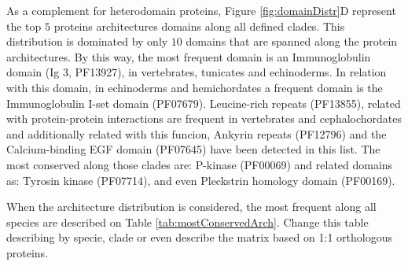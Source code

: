 \documentclass[11pt]{article}
\newcommand{\TODO}[1]{\begingroup\color{red}#1\endgroup}
\begin{document}
As a complement for heterodomain proteins, Figure \ref{fig:domainDistr}D 
represent the top $5$ proteins architectures domains along all defined clades. 
This distribution is dominated by only $10$ domains that are spanned along 
the protein architectures. By this way, the most frequent domain is an 
Immunoglobulin domain (Ig 3, PF13927), in vertebrates, tunicates and 
echinoderms. In relation with this domain, in echinoderms and hemichordates a 
frequent domain is the Immunoglobulin I-set domain (PF07679). Leucine-rich 
repeats (PF13855), related with protein-protein interactions are frequent in 
vertebrates and cephalochordates and additionally related with this funcion, 
Ankyrin repeats (PF12796) and the Calcium-binding EGF domain (PF07645) have 
been detected in this list. The most conserved along those clades are: P-kinase 
(PF00069) and related domains as: Tyrosin kinase (PF07714), and even Pleckstrin 
homology domain (PF00169). 

\TODO{When the architecture distribution is considered, the most frequent along 
all species are described on Table \ref{tab:mostConservedArch}. Change 
this table describing by specie, clade or even describe the matrix based on 1:1 
orthologous proteins.}
\end{document}
